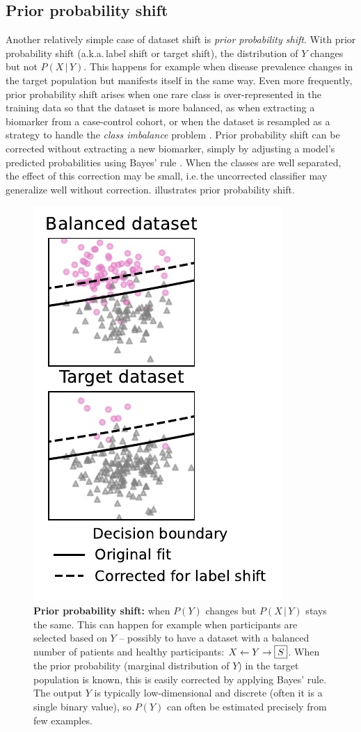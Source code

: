 \documentclass[twocolumn]{article}
\newcommand{\giv}{ \,|\, }
\newcommand{\ie}{i.e.\,}
\newcommand{\aka}{a.k.a.\,}
\begin{document}
\subsection{Prior probability shift}
\label{sec:prior-probability-shift}

Another relatively simple case of dataset shift is \emph{prior probability shift}.
With prior probability shift (\aka label shift or target shift), the
distribution of \(Y\) changes but not \(P(X \giv Y)\).
This happens for example when disease prevalence changes in the target population but manifests itself in the same way.
Even more frequently, prior probability shift arises when one rare class is over-represented in the training data so that the dataset is more balanced, as when extracting a biomarker from a case-control cohort, or when the dataset is resampled as a strategy to handle the \emph{class imbalance} problem \citep{he2009learning}.
Prior probability shift can be corrected without extracting a new biomarker, simply by adjusting a model's predicted probabilities using Bayes' rule \citep[as noted for example in][]{storkey2009training,scholkopf2012causal}.
When the classes are well separated, the effect of this correction may be small, \ie the uncorrected classifier may generalize well without correction.
 illustrates prior probability shift.
%
\begin{figure}
  \centering
  \includegraphics[width=.5\linewidth]{label_shift.pdf}
  \caption{
    \textbf{Prior probability shift:} when \(P(Y)\) changes but \(P(X
    \giv Y)\) stays the same. This can happen for example when participants are
    selected based on \(Y\) -- possibly to have a dataset with a balanced number
    of patients and healthy participants: \(X \leftarrow Y \rightarrow \text{\fbox{$S$}}\).
    When the prior probability (marginal distribution of \(Y\)) in the
    target population is known, this is easily corrected by applying Bayes' rule.
    The output \(Y\) is typically low-dimensional and discrete
    (often it is a single binary value), so \(P(Y)\) can often be estimated
    precisely from few examples.}
  \label{fig:label-shift-scatter}
\end{figure}
\end{document}
